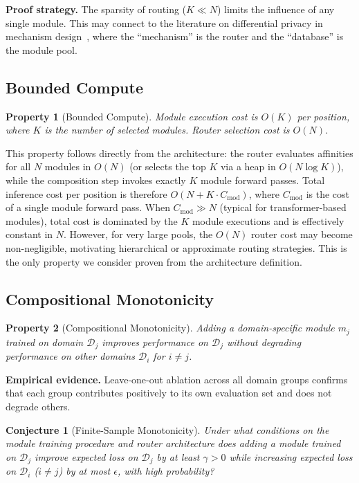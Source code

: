 \documentclass[11pt,a4paper]{article}
\newtheorem{property}{Property}
\newtheorem{conjecture}{Conjecture}
\begin{document}
\noindent\textbf{Proof strategy.} The sparsity of routing ($K \ll N$) limits the influence of any single module. This may connect to the literature on differential privacy in mechanism design~\cite{dwork2014algorithmic}, where the ``mechanism'' is the router and the ``database'' is the module pool.

\subsection{Bounded Compute}
\label{sec:bounded}

\begin{property}[Bounded Compute]
Module execution cost is $O(K)$ per position, where $K$ is the number of selected modules. Router selection cost is $O(N)$.
\end{property}

\noindent This property follows directly from the architecture: the router evaluates affinities for all $N$ modules in $O(N)$ (or selects the top $K$ via a heap in $O(N \log K)$), while the composition step invokes exactly $K$ module forward passes. Total inference cost per position is therefore $O(N + K \cdot C_{\text{mod}})$, where $C_{\text{mod}}$ is the cost of a single module forward pass. When $C_{\text{mod}} \gg N$ (typical for transformer-based modules), total cost is dominated by the $K$ module executions and is effectively constant in $N$. However, for very large pools, the $O(N)$ router cost may become non-negligible, motivating hierarchical or approximate routing strategies. This is the only property we consider proven from the architecture definition.

\subsection{Compositional Monotonicity}
\label{sec:monotonicity}

\begin{property}[Compositional Monotonicity]
Adding a domain-specific module $m_j$ trained on domain $\mathcal{D}_j$ improves performance on $\mathcal{D}_j$ without degrading performance on other domains $\mathcal{D}_i$ for $i \neq j$.
\end{property}

\noindent\textbf{Empirical evidence.} Leave-one-out ablation across all domain groups confirms that each group contributes positively to its own evaluation set and does not degrade others.

\begin{conjecture}[Finite-Sample Monotonicity]
Under what conditions on the module training procedure and router architecture does adding a module trained on $\mathcal{D}_j$ improve expected loss on $\mathcal{D}_j$ by at least $\gamma > 0$ while increasing expected loss on $\mathcal{D}_i$ ($i \neq j$) by at most $\epsilon$, with high probability?
\end{conjecture}
\end{document}
